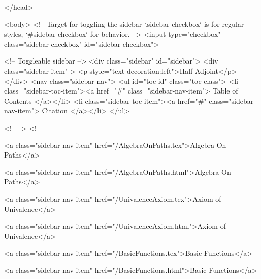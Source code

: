   
</head>




  <body>
    <!-- Target for toggling the sidebar `.sidebar-checkbox` is for regular
     styles, `#sidebar-checkbox` for behavior. -->
<input type="checkbox" class="sidebar-checkbox" id="sidebar-checkbox">

<!-- Toggleable sidebar -->
<div class="sidebar" id="sidebar">
  <div class="sidebar-item" >
    <p style="text-decoration:left">Half Adjoint</p>
  </div>
  <nav class="sidebar-nav">
    <ul id="toc-id" class="toc-class">
  <li class="sidebar-toc-item"><a href="#" class="sidebar-nav-item"> Table of Contents </a></li>
  <li class="sidebar-toc-item"><a href="#" class="sidebar-nav-item"> Citation </a></li>
</ul>


    <!--  -->
    <!-- 
      
    
      
    
      
    
      
        
      
    
      
        
          <a class="sidebar-nav-item" href="/AlgebraOnPaths.tex">Algebra On Paths</a>
        
      
    
      
        
          <a class="sidebar-nav-item" href="/AlgebraOnPaths.html">Algebra On Paths</a>
        
      
    
      
        
          <a class="sidebar-nav-item" href="/UnivalenceAxiom.tex">Axiom of Univalence</a>
        
      
    
      
        
          <a class="sidebar-nav-item" href="/UnivalenceAxiom.html">Axiom of Univalence</a>
        
      
    
      
        
          <a class="sidebar-nav-item" href="/BasicFunctions.tex">Basic Functions</a>
        
      
    
      
        
          <a class="sidebar-nav-item" href="/BasicFunctions.html">Basic Functions</a>
        
      
    
      
        
